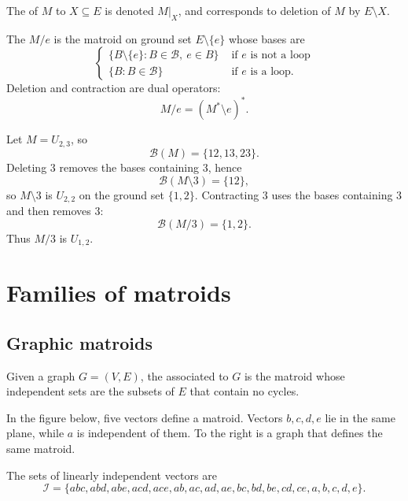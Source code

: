 The \label{matroidRestriction} of $M$ to $X \subseteq E$
is denoted $M \vert_{X}$, and corresponds to deletion of $M$ by $E\setminus X$.


The \label{matroidContraction} $M / e$ is the matroid on
ground set $E\setminus \{e\}$ whose bases are
\[
\begin{cases}
\{ B \setminus \{e\} : B \in \mathcal{B},\ e\in B  \}
  & \text{ if $e$ is not a loop} \\
\{ B : B \in \mathcal{B}  \} & \text{ if $e$ is a loop}.
\end{cases}
\]
Deletion and contraction are dual operators:
\[
  M/e = (M^* \setminus e)^*.
\]

\begin{example}
Let $M=U_{2,3}$, so
\[
  \mathcal{B}(M)=\{12,13,23\}.
\]
Deleting $3$ removes the bases containing $3$, hence
\[
  \mathcal{B}(M\setminus 3)=\{12\},
\]
so $M\setminus 3$ is $U_{2,2}$ on the ground set $\{1,2\}$.  Contracting $3$
uses the bases containing $3$ and then removes $3$:
\[
  \mathcal{B}(M/3)=\{1,2\}.
\]
Thus $M/3$ is $U_{1,2}$.
\end{example}




\section[matroidFamilies]{Families of matroids}


\subsection[matroidGraphic]{Graphic matroids}

Given a graph $G=(V,E)$, the
\label{graphicMatroid} associated to $G$ is the
matroid whose independent sets are the subsets of $E$ that contain no cycles.


\begin{example}
In the figure below, five vectors define a matroid.  Vectors $b,c,d,e$ lie in
the same plane, while $a$ is independent of them.  To the right is a graph
that defines the same matroid.

\begin{figure}
\end{figure}
The sets of linearly independent vectors are
\begin{equation}
  \mathcal{I} = \{ abc, abd, abe, acd, ace, ab, ac, ad, ae, bc, bd, be, cd, ce, a, b, c, d, e \}.
\end{equation}
\end{example}


